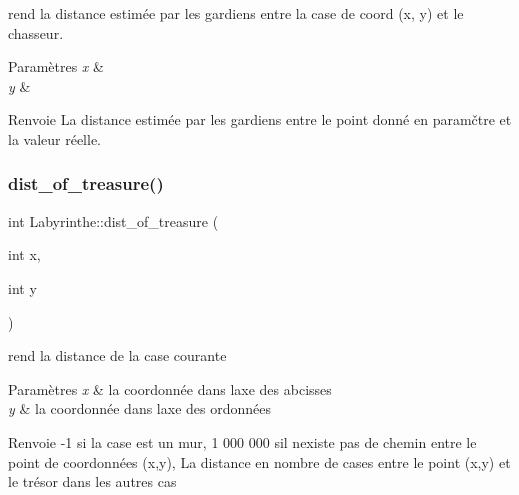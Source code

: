rend la distance estimée par les gardiens entre la case de coord (x, y) et le chasseur. 


\begin{DoxyParams}{Paramètres}
{\em x} & \\
\hline
{\em y} & \\
\hline
\end{DoxyParams}
\begin{DoxyReturn}{Renvoie}
La distance estimée par les gardiens entre le point donné en paramčtre et la valeur réelle. 
\end{DoxyReturn}
\mbox{\label{classLabyrinthe_afed17fdb2dce31cb4671da03c05b88d7}} 
\subsubsection{\texorpdfstring{dist\+\_\+of\+\_\+treasure()}{dist\_of\_treasure()}}
{\footnotesize\ttfamily int Labyrinthe\+::dist\+\_\+of\+\_\+treasure (\begin{DoxyParamCaption}\item[{int}]{x,  }\item[{int}]{y }\end{DoxyParamCaption})\hspace{0.3cm}{\ttfamily [inline]}}



rend la distance de la case courante 


\begin{DoxyParams}{Paramètres}
{\em x} & la coordonnée dans l\textquotesingle{}axe des abcisses \\
\hline
{\em y} & la coordonnée dans l\textquotesingle{}axe des ordonnées \\
\hline
\end{DoxyParams}
\begin{DoxyReturn}{Renvoie}
-\/1 si la case est un mur, 1 000 000 s\textquotesingle{}il n\textquotesingle{}existe pas de chemin entre le point de coordonnées (x,y), La distance en nombre de cases entre le point (x,y) et le trésor dans les autres cas 
\end{DoxyReturn}
\mbox{\label{classLabyrinthe_a90eb03157e5078f9b84162474e0de77f}} 
